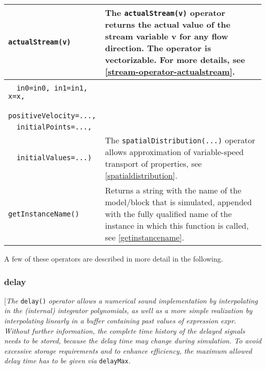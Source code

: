 \begin{longtable}{|p{5.1cm}|p{8cm}|}
\lstinline[basicstyle=\ttfamily]!actualStream(v)! & The \lstinline[basicstyle=\ttfamily]!actualStream(v)! operator returns the actual value
of the stream variable v for any flow direction. The operator is
vectorizable. For more details, see \autoref{stream-operator-actualstream}.\\ 
\hline

\begin{tabular}{@{}p{5.1cm}@{}}
\lstinline[basicstyle=\ttfamily]!spatialDistribution(!\\
\lstinline[basicstyle=\ttfamily]!  in0=in0, in1=in1, x=x,!\\
\lstinline[basicstyle=\ttfamily]!  positiveVelocity=...,!\\
\lstinline[basicstyle=\ttfamily]!  initialPoints=...,!\\
\lstinline[basicstyle=\ttfamily]!  initialValues=...)!
\end{tabular} & 
The \lstinline[basicstyle=\ttfamily]!spatialDistribution(...)! operator allows approximation of
variable-speed transport of properties, see \autoref{spatialdistribution}.\\
\hline

\lstinline[basicstyle=\ttfamily]!getInstanceName()! & Returns a string with the name of the model/block
that is simulated, appended with the fully qualified name of the
instance in which this function is called, see \autoref{getinstancename}.\\ 
\hline
\end{longtable}

A few of these operators are described in more detail in the following.

\subsubsection{delay}

{[}\emph{The} \lstinline[basicstyle=\ttfamily]!delay()! \emph{operator allows a numerical sound
implementation by interpolating in the (internal) integrator
polynomials, as well as a more simple realization by interpolating
linearly in a buffer containing past values of expression expr. Without
further information, the complete time history of the delayed signals
needs to be stored, because the delay time may change during simulation.
To avoid excessive storage requirements and to enhance efficiency, the
maximum allowed delay time has to be given via} \lstinline[basicstyle=\ttfamily]!delayMax!\emph{. }


